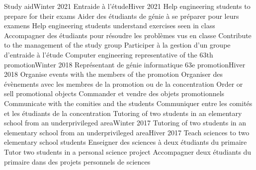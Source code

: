 \documentclass[letterpaper,11pt]{resume}
\begin{document}
    \resumeSubHeadingListStart
      \resumeProjectHeadingEnFr
          {Study aid}{Winter 2021}
          {Entraide à l’étude}{Hiver 2021}
          \resumeItemListStart
            \resumeItemEnFr
                {Help engineering students to prepare for their exams}
                {Aider des étudiants de génie à se préparer pour leurs examens}
            \resumeItemEnFr
                {Help engineering students understand exercises seen in class}
                {Accompagner des étudiants pour résoudre les problèmes vus en classe}
            \resumeItemEnFr
                {Contribute to the management of the study group}
                {Participer à la gestion d’un groupe d’entraide à l’étude}
          \resumeItemListEnd
      \resumeProjectHeadingEnFr
          {Computer engineering representative of the 63th promotion}{Winter 2018}
          {Représentant de génie informatique 63e promotion}{Hiver 2018}
          \resumeItemListStart
            \resumeItemEnFr
                {Organise events with the members of the promotion}
                {Organiser des évènements avec les membres de la promotion ou de la concentration}
            \resumeItemEnFr
                {Order or sell promotional objects}
                {Commander et vendre des objets promotionnels}
            \resumeItemEnFr
                {Communicate with the comities and the students}
                {Communiquer entre les comités et les étudiants de la concentration}
          \resumeItemListEnd
      \resumeProjectHeadingEnFr
          {Tutoring of two students in an elementary school from an underprivileged area}{Winter 2017}
          {Tutoring of two students in an elementary school from an underprivileged area}{Hiver 2017}
          \resumeItemListStart
            \resumeItemEnFr
                {Teach sciences to two elementary school students}
                {Enseigner des sciences à deux étudiants du primaire}
            \resumeItemEnFr
                {Tutor two students in a personal science project}
                {Accompagner deux étudiants du primaire dans des projets personnels de sciences}
          \resumeItemListEnd
    \resumeSubHeadingListEnd
    
\end{document}
